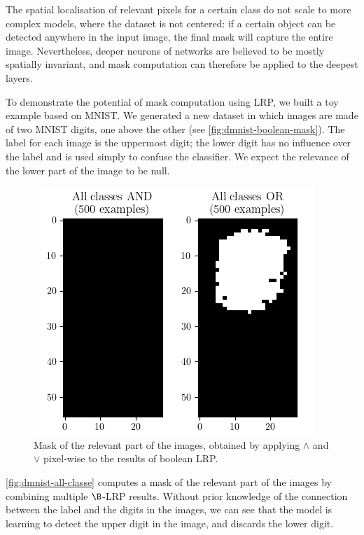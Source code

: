 \documentclass[twocolumn]{../cs-classes/cs-classes}
\newcommand*{\1}{\digitsbb{1}}
\newcommand*{\0}{\digitsbb{0}}
\begin{document}
The spatial localisation of relevant pixels for a certain class do not scale to more complex models, where the dataset is not centered: if a certain object can be detected anywhere in the input image, the final mask will capture the entire image. Nevertheless, deeper neurons of networks are believed to be mostly spatially invariant, and mask computation can therefore be applied to the deepest layers.

To demonstrate the potential of mask computation using LRP, we built a toy example based on MNIST. We generated a new dataset in which images are made of two MNIST digits, one above the other (see \autoref{fig:dmnist-boolean-mask}). The label for each image is the uppermost digit; the lower digit has no influence over the label and is used simply to confuse the classifier. We expect the relevance of the lower part of the image to be null.
\begin{figure}[H]
    \centering
    \includegraphics[width=.85\linewidth]{dmnist-all-classes.png}
    \caption{Mask of the relevant part of the images, obtained by applying $\land$ and $\lor$ pixel-wise to the results of boolean LRP.}
    \label{fig:dmnist-all-classe}
\end{figure}
\autoref{fig:dmnist-all-classe} computes  a mask of the relevant part of the images by combining multiple $\B$-LRP results. Without prior knowledge of the connection between the label and the digits in the images, we can see that the model is learning to detect the upper digit in the image, and discards the lower digit.
\end{document}
